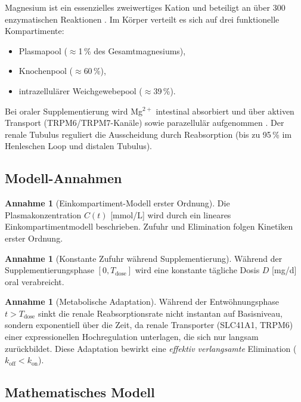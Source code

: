 ﻿\documentclass[12pt,a4paper]{article}
\theoremstyle{plain}
\theoremstyle{definition}
\newtheorem{assumption}[theorem]{Annahme}
\theoremstyle{remark}
\begin{document}
Magnesium ist ein essenzielles zweiwertiges Kation und beteiligt an über
300 enzymatischen Reaktionen \cite{DiNicolantonio2018}. Im Körper verteilt es
sich auf drei funktionelle Kompartimente:
\begin{itemize}
  \item Plasmapool ($\approx$1\,\% des Gesamtmagnesiums),
  \item Knochenpool ($\approx$60\,\%),
  \item intrazellulärer Weichgewebepool ($\approx$39\,\%).
\end{itemize}

Bei oraler Supplementierung wird Mg$^{2+}$ intestinal absorbiert und über
aktiven Transport (TRPM6/TRPM7-Kanäle) sowie parazellulär aufgenommen
\cite{Schuchardt2017}. Der renale Tubulus reguliert die Ausscheidung durch
Reabsorption (bis zu 95\,\% im Henleschen Loop und distalen Tubulus).

\subsection{Modell-Annahmen}

\begin{assumption}[Einkompartiment-Modell erster Ordnung]
\label{ass:onecomp}
Die Plasmakonzentration $C(t)$ [\si{mmol/L}] wird durch ein lineares
Einkompartimentmodell beschrieben. Zufuhr und Elimination folgen
Kinetiken erster Ordnung.
\end{assumption}

\begin{assumption}[Konstante Zufuhr während Supplementierung]
\label{ass:dose}
Während der Supplementierungsphase $[0, T_\text{dose}]$ wird eine konstante
tägliche Dosis $D$ [\si{mg/d}] oral verabreicht.
\end{assumption}

\begin{assumption}[Metabolische Adaptation]
\label{ass:adapt}
Während der Entwöhnungsphase $t > T_\text{dose}$ sinkt die renale
Reabsorptionsrate nicht instantan auf Basisniveau, sondern exponentiell über
die Zeit, da renale Transporter (SLC41A1, TRPM6) einer expressionellen
Hochregulation unterlagen, die sich nur langsam zurückbildet.
Diese Adaptation bewirkt eine \emph{effektiv verlangsamte} Elimination
($k_\text{off} < k_\text{on}$).
\end{assumption}

\subsection{Mathematisches Modell}
\end{document}
